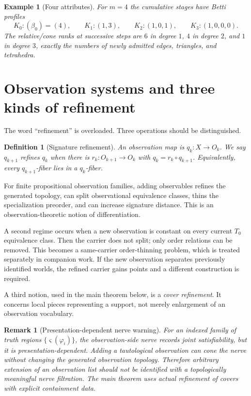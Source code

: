 \documentclass[11pt]{article}
\newtheorem{definition}[theorem]{Definition}
\newtheorem{example}[theorem]{Example}
\newtheorem{remark}[theorem]{Remark}
\begin{document}
\begin{example}[Four attributes]
For $m=4$ the cumulative stages have Betti profiles
\[
K_0:(\beta_0)=(4),\qquad
K_1:(1,3),\qquad
K_2:(1,0,1),\qquad
K_3:(1,0,0,0).
\]
The relative/cone ranks at successive steps are $6$ in degree $1$, $4$ in degree $2$, and $1$ in degree $3$, exactly the numbers of newly admitted edges, triangles, and tetrahedra.
\end{example}

\section{Observation systems and three kinds of refinement}

The word ``refinement'' is overloaded.  Three operations should be distinguished.

\begin{definition}[Signature refinement]
An observation map is $q_k:X\to O_k$.  We say $q_{k+1}$ refines $q_k$ when there is $r_k:O_{k+1}\to O_k$ with $q_k=r_k\circ q_{k+1}$.  Equivalently, every $q_{k+1}$-fiber lies in a $q_k$-fiber.
\end{definition}

For finite propositional observation families, adding observables refines the generated topology, can split observational equivalence classes, thins the specialization preorder, and can increase signature distance.  This is an observation-theoretic notion of differentiation.

A second regime occurs when a new observation is constant on every current $T_0$ equivalence class.  Then the carrier does not split; only order relations can be removed.  This becomes a same-carrier order-thinning problem, which is treated separately in companion work.  If the new observation separates previously identified worlds, the refined carrier gains points and a different construction is required.

A third notion, used in the main theorem below, is a \emph{cover refinement}.  It concerns local pieces representing a support, not merely enlargement of an observation vocabulary.

\begin{remark}[Presentation-dependent nerve warning]
For an indexed family of truth regions $\{\varsigma(\varphi_i)\}$, the observation-side nerve records joint satisfiability, but it is presentation-dependent.  Adding a tautological observation can cone the nerve without changing the generated observation topology.  Therefore arbitrary extension of an observation list should not be identified with a topologically meaningful nerve filtration.  The main theorem uses actual refinement of covers with explicit containment data.
\end{remark}
\end{document}

